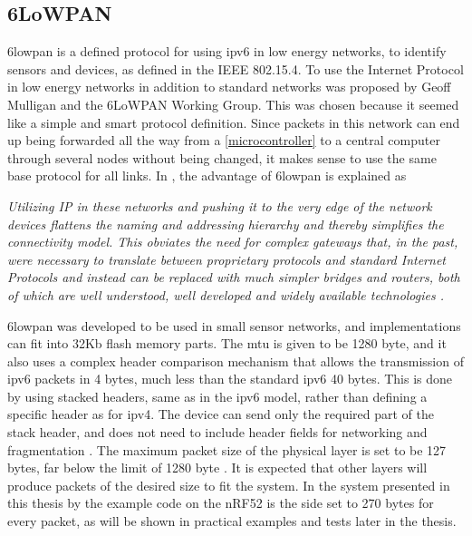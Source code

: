 
\subsection{6LoWPAN}


\gls{6lowpan} is a defined protocol for using \gls{ipv6} in low energy networks, to identify sensors and devices, as defined in the IEEE 802.15.4. To use the Internet Protocol in low energy networks in addition to standard networks was proposed by Geoff Mulligan and the 6LoWPAN Working Group. This was chosen because it seemed like a simple and smart protocol definition. Since packets in this network can end up being forwarded all the way from a \ref{microcontroller} to a central computer through several nodes without being changed, it makes sense to use the same base protocol for all links. In \cite{mulligan20076lowpan}, the advantage of \gls{6lowpan} is explained as 

\noindent\textit{Utilizing IP  in these networks and pushing it to the very edge of the network devices flattens the naming and addressing hierarchy and  thereby  simplifies  the  connectivity  model. This obviates the need  for  complex  gateways  that,  in  the  past,  were  necessary  to translate   between   proprietary   protocols   and   standard   Internet Protocols and instead can be replaced with much simpler bridges and  routers,  both  of  which  are  well  understood, well  developed and  widely  available  technologies \cite{mulligan20076lowpan}.}


\gls{6lowpan} was developed to be used in small sensor networks, and implementations can fit into 32Kb flash memory parts. The \gls{mtu} is given to be 1280 byte, and it also uses a complex header comparison mechanism that allows the transmission of \gls{ipv6} packets in 4 bytes, much less than the standard \gls{ipv6} 40 bytes. This is done by using stacked headers, same as in the \gls{ipv6} model, rather than defining a specific header as for \gls{ipv4}. The device can send only the required part of the stack header, and does not need to include header fields for networking and fragmentation \cite{hui2008extending}. The maximum packet size of the physical layer is set to be 127 bytes, far below the limit of 1280 byte \cite{kushalnagar2007transmission}. It is expected that other layers will produce packets of the desired size to fit the system. In the system presented in this thesis by the example code on the nRF52 is the side set to 270 bytes for every packet, as will be shown in practical examples and tests later in the thesis. 


